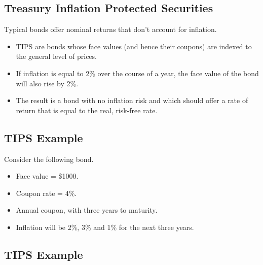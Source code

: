 \documentclass[letterpaper,10pt,english]{sphinxmanual}
\begin{document}
\subsection{Treasury Inflation Protected Securities}
\label{bondPrices:treasury-inflation-protected-securities}
Typical bonds offer nominal returns that don't account for inflation.
\begin{itemize}
\item {} 
TIPS are bonds whose face values (and hence their coupons) are
indexed to the general level of prices.

\end{itemize}
\begin{itemize}
\item {} 
If inflation is equal to 2\% over the course of a year, the face
value of the bond will also rise by 2\%.

\end{itemize}
\begin{itemize}
\item {} 
The result is a bond with no inflation risk and which should offer a
rate of return that is equal to the real, risk-free rate.

\end{itemize}


\subsection{TIPS Example}
\label{bondPrices:tips-example}
Consider the following bond.
\begin{itemize}
\item {} 
Face value = \$1000.

\end{itemize}
\begin{itemize}
\item {} 
Coupon rate = 4\%.

\end{itemize}
\begin{itemize}
\item {} 
Annual coupon, with three years to maturity.

\end{itemize}
\begin{itemize}
\item {} 
Inflation will be 2\%, 3\% and 1\% for the next three years.

\end{itemize}


\subsection{TIPS Example}
\label{bondPrices:id2}
$\qquad$
\end{document}
